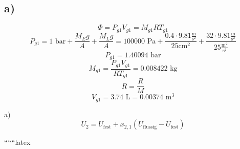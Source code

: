 

\subsection*{a)}
\[
\Phi = P_{g1} V_{g1} = M_{g1} R T_{g1}
\]
\[
P_{g1} = 1 \text{ bar} + \frac{M_{E} g}{A} + \frac{M_{L} g}{A} = 100000 \text{ Pa} + \frac{0.4 \cdot 9.81 \frac{\text{m}}{\text{s}^2}}{25 \text{cm}^2} + \frac{32 \cdot 9.81 \frac{\text{m}}{\text{s}^2}}{25 \frac{\text{m}^2}{\text{s}^2}}
\]
\[
P_{g1} = 1.40094 \text{ bar}
\]
\[
M_{g1} = \frac{P_{g1} V_{g1}}{R T_{g1}} = 0.008422 \text{ kg}
\]
\[
R = \frac{R}{M}
\]
\[
V_{g1} = 3.74 \text{ L} = 0.00374 \text{ m}^3
\]

a) \[ U_2 = U_{\text{fest}} + x_{2,1} \left( U_{\text{flussig}} - U_{\text{fest}} \right) \]

``````latex